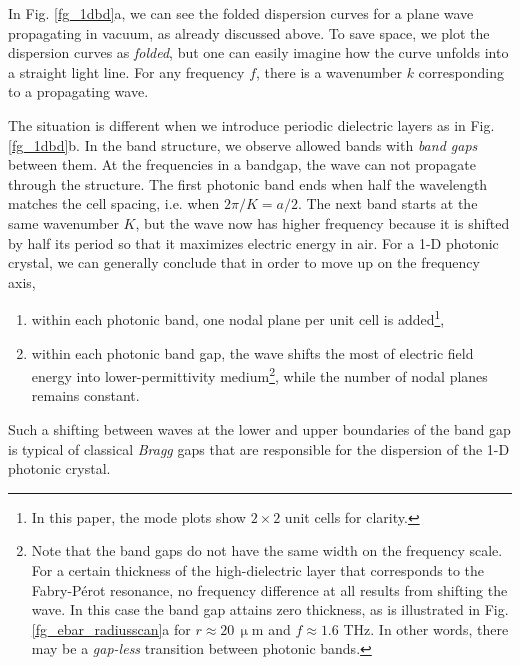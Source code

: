 In Fig. \ref{fg_1dbd}a, we can see the folded dispersion curves for a plane wave propagating in vacuum, as already discussed above. 
To save space, we plot the  dispersion curves as \textit{folded}, but one can easily imagine how the curve unfolds into a straight light line. For any frequency $f$, there is a wavenumber $k$ corresponding to a propagating wave. 


The situation is different when we introduce periodic dielectric layers as in Fig. \ref{fg_1dbd}b. In the band structure, we observe allowed bands with \textit{band gaps} between them. At the frequencies in a bandgap, the wave can not propagate through the structure. The first photonic band ends when half the wavelength matches the cell spacing, i.e. when $2\pi / K= a/2$. The next band starts at the same wavenumber $K$, but the wave now has higher frequency because it is shifted by half its period so that it maximizes electric energy in air. For a 1-D photonic crystal, we can generally conclude that in order to move up on the frequency axis,
\begin{enumerate}
 \item{within each photonic band, one nodal plane per unit cell is added\footnote{In this paper, the mode plots show $2\times 2$ unit cells for clarity.},} 
 \item{within each photonic band gap, the wave shifts the most of electric field energy into lower-permittivity medium\footnote{Note that the band gaps do not have the same width on the frequency scale. For a certain thickness of the high-dielectric layer that corresponds to the Fabry-Pérot resonance, no frequency difference at all results from shifting the wave. In this case the band gap attains zero thickness, as is illustrated in Fig. \ref{fg_ebar_radiusscan}a for $r\approx20\,\upmu$m and $f\approx1.6$ THz. In other words, there may be a \textit{gap-less} transition between photonic bands.}, while the number of nodal planes remains constant. }
 \end{enumerate}

Such a shifting between waves at the lower and upper boundaries of the band gap is typical of classical \textit{Bragg} gaps that are responsible for the dispersion of the 1-D photonic crystal. 

